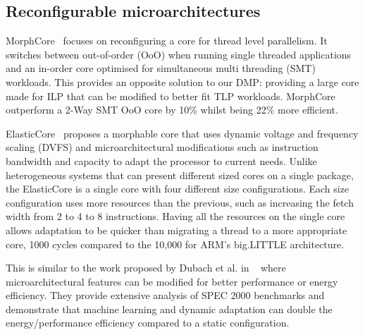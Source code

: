 \vspace{-1em}
\subsection{Reconfigurable microarchitectures}

MorphCore~\cite{khubaibMorphCore2012} focuses on reconfiguring a core for thread level parallelism.
It switches between out-of-order (OoO) when running single threaded applications and an in-order core optimised for simultaneous multi threading (SMT) workloads.
This provides an opposite solution to our DMP: providing a large core made for ILP that can be modified to better fit TLP workloads.
MorphCore outperform a 2-Way SMT OoO core by 10\% whilst being 22\% more efficient.

ElasticCore~\cite{tavanaElastic} proposes a morphable core that uses dynamic voltage and frequency scaling (DVFS) and microarchitectural modifications such as instruction bandwidth and capacity to adapt the processor to current needs.
Unlike heterogeneous systems that can present different sized cores on a single package, the ElasticCore is a single core with four different size configurations.
Each size configuration uses more resources than the previous, such as increasing the fetch width from 2 to 4 to 8 instructions.
Having all the resources on the single core allows adaptation to be quicker than migrating a thread to a  more appropriate core, 1000 cycles compared to the 10,000 for ARM's big.LITTLE architecture.

This is similar to the work proposed by Dubach et al. in ~\cite{dubach13dynamic} where microarchitectural features can be modified for better performance or energy efficiency.
They provide extensive analysis of SPEC 2000 benchmarks and demonstrate that machine learning and dynamic adaptation can double the energy/performance efficiency compared to a static configuration.


